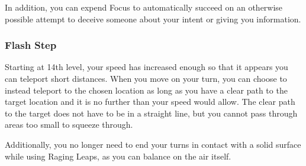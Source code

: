 In addition, you can expend Focus to automatically succeed on an otherwise possible attempt to deceive someone about your intent or giving you information.

\subsubsection{Flash Step}
Starting at 14th level, your speed has increased enough so that it appears you can teleport short distances. When you move on your turn, you can choose to instead teleport to the chosen location as long as you have a clear path to the target location and it is no further than your speed would allow. The clear path to the target does not have to be in a straight line, but you cannot pass through areas too small to squeeze through.

Additionally, you no longer need to end your turns in contact with a solid surface while using Raging Leaps, as you can balance on the air itself.